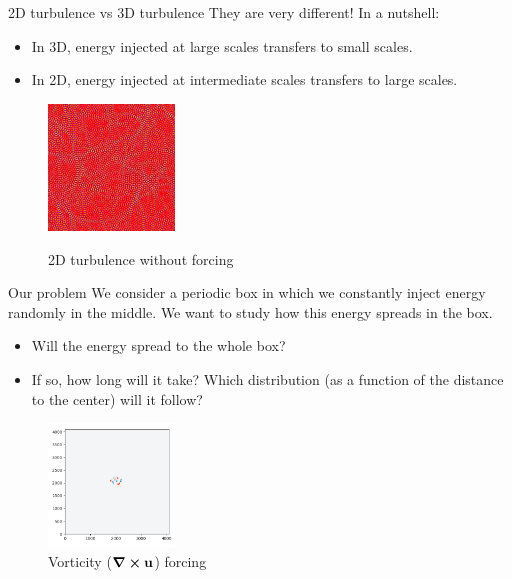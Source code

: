 \documentclass{beamer} %
\begin{document}
\begin{frame}{2D turbulence vs 3D turbulence}
	They are very different! In a nutshell:
	\begin{itemize}
		\item In 3D, energy injected at large scales transfers to small scales.
		\item In 2D, energy injected at intermediate scales transfers to large scales.
	\end{itemize}

	\vspace{0.3cm}
	\begin{figure}
		\centering
		\href{./videos/condensation_small_fast.mp4}{
			\includegraphics[width=0.3\textwidth]{images/condensation_small_fast-0.png}
		}
		\caption{2D turbulence without forcing}
	\end{figure}
\end{frame}
\begin{frame}{Our problem}
	We consider a periodic box in which we constantly inject energy randomly in the middle. We want to study how this energy spreads in the box.
	\begin{itemize}
		\item Will the energy spread to the whole box?
		\item If so, how long will it take? Which distribution (as a function of the distance to the center) will it follow?
	\end{itemize}
	\begin{figure}
		\centering
		\includegraphics[width=0.3\textwidth]{images/FlowD_fw.002.png}
		\caption{Vorticity ($\curl \boldsymbol{\mathrm{u}}$) forcing}
	\end{figure}
\end{frame}
\end{document}
